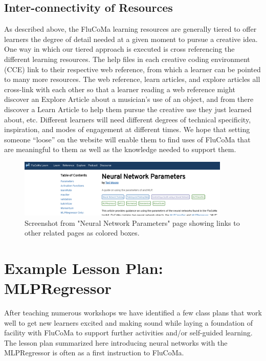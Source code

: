 \documentclass{article}
\begin{document}
\subsection{Inter-connectivity of
Resources}\label{inter-connectivity-of-resources}

As described above, the FluCoMa learning resources are generally tiered
to offer learners the degree of detail needed at a given moment to
pursue a creative idea. One way in which our tiered approach is executed
is cross referencing the different learning resources. The help files in
each creative coding environment (CCE) link to their respective web
reference, from which a learner can be pointed to many more resources.
The web reference, learn articles, and explore articles all cross-link
with each other so that a learner reading a web reference might discover
an Explore Article about a musician's use of an object, and from there
discover a Learn Article to help them pursue the creative use they just
learned about, etc. Different learners will need different degrees of
technical specificity, inspiration, and modes of engagement at different
times. We hope that setting someone ``loose'' on the website will enable
them to find uses of FluCoMa that are meaningful to them as well as the
knowledge needed to support them.

\begin{figure}[ht]
\centering
\includegraphics[width=0.9\textwidth]{./figures/interconnected-resources.png}
\caption{Screenshot from "Neural Network Parameters" page showing links to other related pages as colored boxes.}
\label{fig:interconnected-resources}
\end{figure}

\section{Example Lesson Plan: MLPRegressor}\label{example-lesson-plan}

After teaching numerous workshops we have identified a few class plans
that work well to get new learners excited and making sound while laying
a foundation of facility with FluCoMa to support further activities
and/or self-guided learning. The lesson plan summarized here introducing neural networks with the MLPRegressor is often as a first instruction to FluCoMa.
\end{document}
